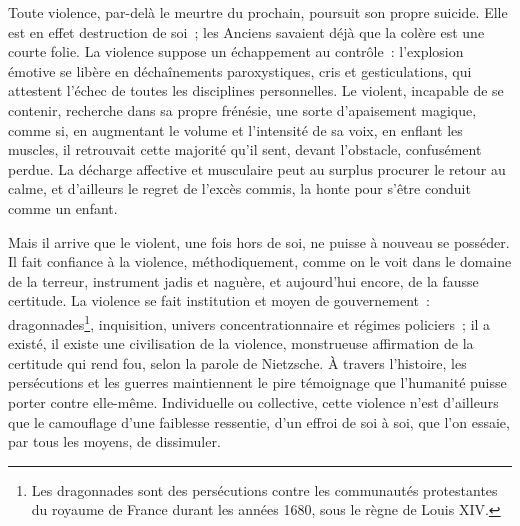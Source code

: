 {Toute violence, par-delà le meurtre du prochain, poursuit son propre suicide. Elle est en effet destruction de soi~; les Anciens savaient déjà que la colère est une courte folie. La violence suppose un échappement au contrôle~: l'explosion émotive se libère en déchaînements paroxystiques, cris et gesticulations, qui attestent l'échec de toutes les disciplines personnelles. Le violent, incapable de se contenir, recherche dans sa propre frénésie, une sorte d'apaisement magique, comme si, en augmentant le volume et l'intensité de sa voix, en enflant les muscles, il retrouvait cette majorité qu'il sent, devant l'obstacle, confusément perdue. La décharge affective et musculaire peut au surplus procurer le retour au calme, et d'ailleurs le regret de l'excès commis, la honte pour s'être conduit comme un enfant.

Mais il arrive que le violent, une fois hors de soi, ne puisse à nouveau se posséder. Il fait confiance à la violence, méthodiquement, comme on le voit dans le domaine de la terreur, instrument jadis et naguère, et aujourd'hui encore, de la fausse certitude. La violence se fait institution et moyen de gouvernement~: dragonnades\footnote{Les dragonnades sont des persécutions contre les communautés protestantes du royaume de France durant les années 1680, sous le règne de Louis XIV.}, inquisition, univers concentrationnaire et régimes policiers~; il a existé, il existe une civilisation de la violence, monstrueuse affirmation de la certitude qui rend fou, selon la parole de Nietzsche. À travers l'histoire, les persécutions et les guerres maintiennent le pire témoignage que l'humanité puisse porter contre elle-même. Individuelle ou collective, cette violence n'est d'ailleurs que le camouflage d'une faiblesse ressentie, d'un effroi de soi à soi, que l'on essaie, par tous les moyens, de dissimuler.
}

